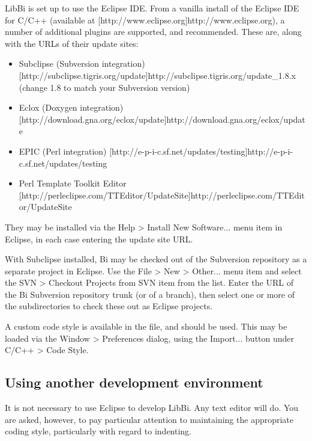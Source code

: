 LibBi is set up to use the Eclipse IDE. From a vanilla install of the Eclipse
IDE for C/C++ (available at
\hyperref[hyper][http://www.eclipse.org]{http://www.eclipse.org}), a number of
additional plugins are supported, and recommended. These are, along with the
URLs of their update sites:
\begin{itemize}
\item Subclipse (Subversion integration)
  \hyperref[hyper][http://subclipse.tigris.org/update]{http://subclipse.tigris.org/update\_1.8.x}
  (change 1.8 to match your Subversion version)

\item Eclox (Doxygen integration) \hyperref[hyper][http://download.gna.org/eclox/update]{http://download.gna.org/eclox/update}

\item EPIC (Perl integration) \hyperref[hyper][http://e-p-i-c.sf.net/updates/testing]{http://e-p-i-c.sf.net/updates/testing}

\item Perl Template Toolkit Editor \hyperref[hyper][http://perleclipse.com/TTEditor/UpdateSite]{http://perleclipse.com/TTEditor/UpdateSite}
\end{itemize}
They may be installed via the \textsf{Help > Install New Software...} menu
item in Eclipse, in each case entering the update site URL.

With Subclipse installed, Bi may be checked out of the Subversion repository
as a separate project in Eclipse. Use the \textsf{File > New > Other...} menu
item and select the \textsf{SVN > Checkout Projects from SVN} item from the
list. Enter the URL of the Bi Subversion repository trunk (or of a branch),
then select one or more of the subdirectories to check these out as Eclipse
projects.

 A custom code style is available in the
 file, and should be used. This may be loaded
via the \textsf{Window > Preferences} dialog, using the \textsf{Import...}
button under \textsf{C/C++ > Code Style}.

\subsection{Using another development environment}

It is not necessary to use Eclipse to develop LibBi. Any text editor will
do. You are asked, however, to pay particular attention to maintaining the
appropriate coding style, particularly with regard to indenting.

